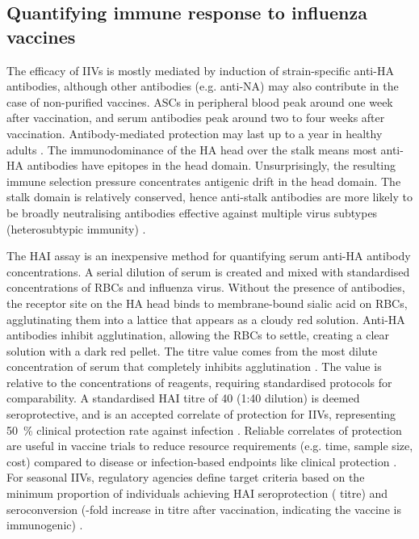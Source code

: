 \subsection{Quantifying immune response to influenza vaccines}

The efficacy of \glspl{IIV} is mostly mediated by induction of strain-specific anti-\gls{HA} antibodies,
although other antibodies (e.g. anti-\gls{NA}) may also contribute in the case of non-purified vaccines.
\Glspl{ASC} in peripheral blood peak around one week after vaccination, and serum antibodies peak around two to four weeks after vaccination.
Antibody-mediated protection may last up to a year in healthy adults \autocite{bresee2018InactivatedInfluenzaVaccines,davis2020InfluenzaVaccineInduced}.
The immunodominance of the \gls{HA} head over the stalk means most anti-\gls{HA} antibodies have epitopes in the head domain.
Unsurprisingly, the resulting immune selection pressure concentrates antigenic drift in the head domain.
The stalk domain is relatively conserved, hence anti-stalk antibodies are more likely to be broadly neutralising antibodies effective against multiple virus subtypes (heterosubtypic immunity) \autocite{sano2017RoadMoreEffective}.

The \gls{HAI} assay is an inexpensive method for quantifying serum anti-\gls{HA} antibody concentrations. 
A serial dilution of serum is created and mixed with standardised concentrations of \glspl{RBC} and influenza virus. 
Without the presence of antibodies, the receptor site on the \gls{HA} head binds to membrane-bound sialic acid on \glspl{RBC}, agglutinating them into a lattice that appears as a cloudy red solution.
Anti-\gls{HA} antibodies inhibit agglutination, allowing the \glspl{RBC} to settle, creating a clear solution with a dark red pellet. 
The titre value comes from the most dilute concentration of serum that completely inhibits agglutination \autocite{klimov2012InfluenzaVirusTitration}.
The value is relative to the concentrations of reagents, requiring standardised protocols for comparability.
A standardised \gls{HAI} titre of 40 (1:40 dilution) is deemed seroprotective, and is an accepted correlate of protection for \glspl{IIV},
representing \SI{50}{\percent} clinical protection rate against infection \autocite{cox2013CorrelatesProtectionInfluenza,bresee2018InactivatedInfluenzaVaccines}.
Reliable correlates of protection are useful in vaccine trials to reduce resource requirements (e.g. time, sample size, cost) compared to disease or infection-based endpoints like clinical protection \autocite{pulendran2010SystemsVaccinology}.
For seasonal \glspl{IIV}, regulatory agencies define target criteria based on the
minimum proportion of individuals achieving \gls{HAI} seroprotection (\si{} titre) 
and seroconversion (\si{}-fold increase in titre after vaccination, indicating the vaccine is immunogenic) \autocite{cox2013CorrelatesProtectionInfluenza,sano2017RoadMoreEffective,krammer2019HumanAntibodyResponse}.


